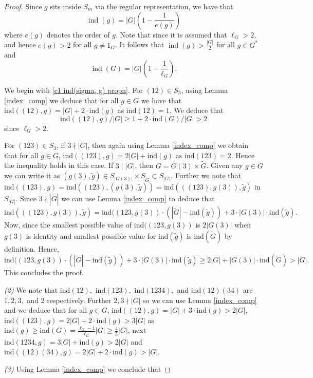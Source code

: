\documentclass[10pt,a4paper]{amsart}
\newcommand{\ind}{\mathrm{ind}}
\newcommand{\op}[1]{\operatorname{#1}}
\begin{document}
\begin{proof} Since $g$ sits inside $S_m$ via the regular representation, we have that \begin{equation}\label{ind g equation}\op{ind}(g)=|G|\left(1-\frac{1}{e(g)}\right)\end{equation} where $e(g)$ denotes the order of $g$. Note that since it is assumed that $\ell_G>2$, and hence $e(g)>2$ for all $g\neq 1_G$. It follows that $\op{ind}(g)>\frac{|G|}{2}$ for all $g\in G^\ast$ and \[\op{ind}(G)=|G|\left(1-\frac{1}{\ell_G}\right).\]
\par We begin with \eqref{c1 ind(sigma, g) propn}. For $(12) \in S_3$, using Lemma \ref{index_comp} we deduce that for all $g \in G$ we have that $\ind((12),g) = |G| + 2\cdot \ind(g)$ as $\ind(12) = 1$. We deduce that \[\ind((12),g)/|G| \geq 1 + 2\cdot\ind(G)/|G| > 2\]
since $\ell_G > 2$.
\par For $(123) \in S_3$, if $3 \nmid |G|$, then again using Lemma \ref{index_comp} we obtain that for all $g \in G$, $\ind((123),g) = 2|G| + \ind(g)$ as $\ind(123) = 2$. Hence the inequality holds in this case. If $3 \mid |G|$, then $G= G(3)\times \widetilde{G}$. Given any $g \in G$ we can write it as $(g(3), \widetilde{g}) \in S_{|G(3)|}\times S_{\widetilde{G}} \subset S_{|G|}$. Further we note that $\ind((123),g) = \ind((123),(g(3),\widetilde{g})) = \ind(((123),g(3)),\widetilde{g})$ in $S_{|G|}$. Since $3 \nmid |\widetilde{G}|$ we can use Lemma \ref{index_comp} to deduce that \[\ind(((123),g(3)),\widetilde{g}) = \ind((123,g(3))\cdot(|\widetilde{G}|-\ind(\widetilde{g}))+3\cdot|G(3)|\cdot\ind(\widetilde{g}).\] Now, since the smallest possible value of $\ind((123,g(3))$ is $2|G(3)|$ when $g(3)$ is identity and smallest possible value for $\ind(\widetilde{g})$ is $\ind(\widetilde{G})$ by definition. Hence, \[
\ind((123,g(3))\cdot(|\widetilde{G}|-\ind(\widetilde{g}))+3\cdot|G(3)|\cdot\ind(\widetilde{g}) \geq 2|G| + |G(3)|\cdot\ind(\widetilde{G}) > |G|.\] This concludes the proof.
\par \textit{(2)} We note that  $\ind(12),$ $\ind(123),$ $\ind(1234),$ and $\ind(12)(34)$ are $1, 2, 3,$ and $2$ respectively. Further $2,3 \nmid |G|$ so we can use Lemma \ref{index_comp} and we deduce that for all $g \in G$, $\ind((12),g) = |G| + 3\cdot\ind(g) > 2|G|$, $\ind((123),g) = 2|G| + 2\cdot\ind(g) > 3|G|$ as $\ind(g) \geq \ind(G) = \frac{\ell_G-1}{\ell_G} |G| \geq \frac{4}{5}|G|$, next $\ind(1234, g) = 3|G| + \ind(g) > 2|G|$ and $\ind((12)(34), g) = 2|G| + 2\cdot \ind(g) > |G|$.
\par \textit{(3)} Using Lemma \ref{index_comp} we conclude that 

\end{proof}
\end{document}
